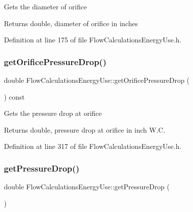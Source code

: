 Gets the diameter of orifice

\begin{DoxyReturn}{Returns}
double, diameter of orifice in inches 
\end{DoxyReturn}


Definition at line 175 of file Flow\+Calculations\+Energy\+Use.\+h.

\mbox{\label{class_flow_calculations_energy_use_ac42e5918bba0c56406f39437317a2a87}} 
\subsubsection{\texorpdfstring{get\+Orifice\+Pressure\+Drop()}{getOrificePressureDrop()}}
{\footnotesize\ttfamily double Flow\+Calculations\+Energy\+Use\+::get\+Orifice\+Pressure\+Drop (\begin{DoxyParamCaption}{ }\end{DoxyParamCaption}) const\hspace{0.3cm}{\ttfamily [inline]}}

Gets the pressure drop at orifice

\begin{DoxyReturn}{Returns}
double, pressure drop at orifice in inch W.\+C. 
\end{DoxyReturn}


Definition at line 317 of file Flow\+Calculations\+Energy\+Use.\+h.

\mbox{\label{class_flow_calculations_energy_use_a35aa80b2b9ea8769d56bf9e8d5837927}} 
\subsubsection{\texorpdfstring{get\+Pressure\+Drop()}{getPressureDrop()}}
{\footnotesize\ttfamily double Flow\+Calculations\+Energy\+Use\+::get\+Pressure\+Drop (\begin{DoxyParamCaption}{ }\end{DoxyParamCaption})}

